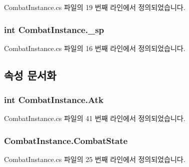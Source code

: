Combat\+Instance.\+cs 파일의 19 번째 라인에서 정의되었습니다.

\subsubsection[{\texorpdfstring{\+\_\+sp}{_sp}}]{\setlength{\rightskip}{0pt plus 5cm}int Combat\+Instance.\+\_\+sp\hspace{0.3cm}{\ttfamily [private]}}\hypertarget{class_combat_instance_a3a9ee2ea52b19b5150386b52396621f9}{}\label{class_combat_instance_a3a9ee2ea52b19b5150386b52396621f9}


Combat\+Instance.\+cs 파일의 16 번째 라인에서 정의되었습니다.



\subsection{속성 문서화}
\subsubsection[{\texorpdfstring{Atk}{Atk}}]{\setlength{\rightskip}{0pt plus 5cm}int Combat\+Instance.\+Atk\hspace{0.3cm}{\ttfamily [get]}}\hypertarget{class_combat_instance_a9de7c50888b56d9854709d132e69baa9}{}\label{class_combat_instance_a9de7c50888b56d9854709d132e69baa9}


Combat\+Instance.\+cs 파일의 41 번째 라인에서 정의되었습니다.

\subsubsection[{\texorpdfstring{Combat\+State}{CombatState}}]{ Combat\+Instance.\+Combat\+State\hspace{0.3cm}{\ttfamily [get]}}\hypertarget{class_combat_instance_a149d2068f3dc0ec72f3461d101dcebab}{}\label{class_combat_instance_a149d2068f3dc0ec72f3461d101dcebab}


Combat\+Instance.\+cs 파일의 25 번째 라인에서 정의되었습니다.

